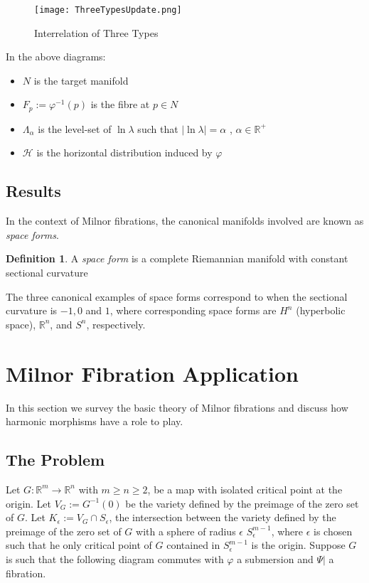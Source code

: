 \documentclass[12pt]{article}
\theoremstyle{definition}
\newtheorem{definition}{Definition}[section]
\numberwithin{equation}{subsection}
\begin{document}
    \begin{figure}[H]
    \centering
    \texttt{[image: ThreeTypesUpdate.png]}
    \caption{Interrelation of Three Types}
    \label{fig:Interrelation of Three Types}
    \end{figure}


In the above diagrams:
\begin{itemize}
    \item $N$ is the target manifold
    \item $F_p:= \varphi^{-1}(p)$ is the fibre at $p \in N$
    \item $\Lambda_\alpha$ is the level-set of $\ln \lambda$ such that $\left| \ln \lambda   \right| = \alpha$ , $\alpha \in \mathbb{R}^+$
    \item $\mathcal{H}$ is the horizontal distribution induced by $\varphi$
\end{itemize}

\subsection{Results}
In the context of Milnor fibrations, the canonical manifolds involved are known as \textit{space forms}. 

\begin{definition}
A \textit{space form} is a complete Riemannian manifold with constant sectional curvature
\end{definition}
The three canonical examples of space forms correspond to when the sectional curvature is $-1, 0$ and $1$, where corresponding space forms are $H^n$ (hyperbolic space), $\mathbb{R}^n$, and $S^n$, respectively. 
\section{Milnor Fibration Application}\label{sec: MilnorFib} 
In this section we survey the basic theory of Milnor fibrations and discuss how harmonic morphisms have a role to play.

\subsection{The Problem}
Let $G: \mathbb{R}^m \rightarrow \mathbb{R}^n$ with $m \geq n \geq 2$, be a map with isolated critical point at the origin. Let $V_G := G^{-1}(0)$ be the variety defined by the preimage of the zero set of $G$. Let $K_\epsilon := V_G \cap S_\epsilon$, the intersection between the variety defined by the preimage of the zero set of $G$ with a sphere of radius $\epsilon$ $S^{m-1}_\epsilon$, where $\epsilon$ is chosen such that he only critical point of $G$ contained in $S^{m-1}_\epsilon$ is the origin. Suppose $G$ is such that the following diagram commutes with $\varphi$ a submersion and $\Psi|$ a fibration.
\end{document}
